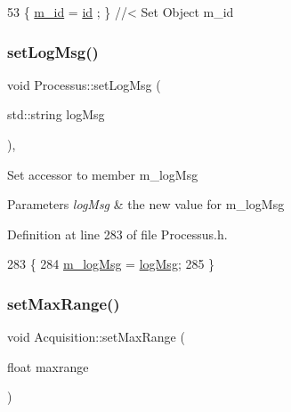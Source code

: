 \begin{DoxyCode}
53 \{ \hyperlink{classObject_aca74b9dbfed7b5556ea2d56c65b6b6b0}{m\_id}    = \hyperlink{classObject_af99145335cc61ff6e2798ea17db009d2}{id}    ; \} \textcolor{comment}{//< Set Object m\_id}
\end{DoxyCode}
\mbox{\label{classProcessus_a471833f89047aa9a7ff6200a31c17a1d}} 
\subsubsection{\texorpdfstring{set\+Log\+Msg()}{setLogMsg()}}
{\footnotesize\ttfamily void Processus\+::set\+Log\+Msg (\begin{DoxyParamCaption}\item[{std\+::string}]{log\+Msg }\end{DoxyParamCaption})\hspace{0.3cm}{\ttfamily [inline]}, {\ttfamily [inherited]}}

Set accessor to member m\+\_\+log\+Msg 
\begin{DoxyParams}{Parameters}
{\em log\+Msg} & the new value for m\+\_\+log\+Msg \\
\hline
\end{DoxyParams}


Definition at line 283 of file Processus.\+h.


\begin{DoxyCode}
283                                     \{
284     \hyperlink{classProcessus_a3bc0140a3a69a83951ab7f9986bd2c84}{m\_logMsg} = \hyperlink{classProcessus_a42fdeb17dc13ba854222666b6aa29b61}{logMsg};
285   \}
\end{DoxyCode}
\mbox{\label{classAcquisition_a786da6cff5428020034be23e554e0e1b}} 
\subsubsection{\texorpdfstring{set\+Max\+Range()}{setMaxRange()}\hspace{0.1cm}{\footnotesize\ttfamily [1/2]}}
{\footnotesize\ttfamily void Acquisition\+::set\+Max\+Range (\begin{DoxyParamCaption}\item[{float}]{maxrange }\end{DoxyParamCaption})\hspace{0.3cm}{\ttfamily [inline]}}



